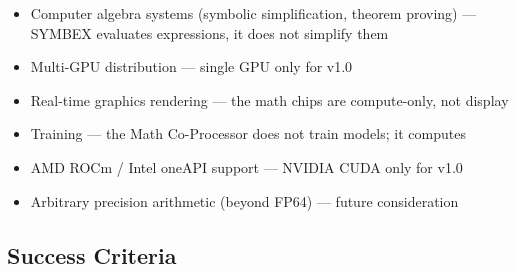 \documentclass[11pt,letterpaper]{article}
\begin{document}
\begin{itemize}[leftmargin=2em]
\item Computer algebra systems (symbolic simplification, theorem proving) --- SYMBEX evaluates expressions, it does not simplify them
\item Multi-GPU distribution --- single GPU only for v1.0
\item Real-time graphics rendering --- the math chips are compute-only, not display
\item Training --- the Math Co-Processor does not train models; it computes
\item AMD ROCm / Intel oneAPI support --- NVIDIA CUDA only for v1.0
\item Arbitrary precision arithmetic (beyond FP64) --- future consideration
\end{itemize}

\subsection{Success Criteria}
\end{document}
